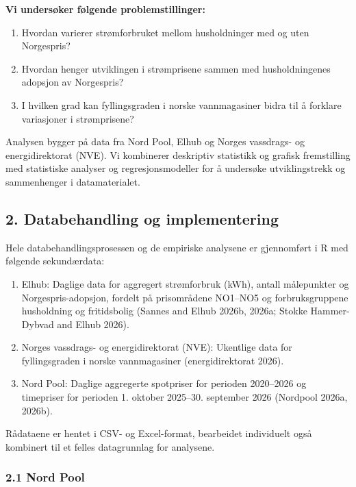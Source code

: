 \documentclass[
  letterpaper,
  DIV=11,
  numbers=noendperiod]{scrartcl}
\begin{document}
\textbf{Vi undersøker følgende problemstillinger:}

\begin{enumerate}
\def\labelenumi{\arabic{enumi}.}
\item
  Hvordan varierer strømforbruket mellom husholdninger med og uten
  Norgespris?
\item
  Hvordan henger utviklingen i strømprisene sammen med husholdningenes
  adopsjon av Norgespris?
\item
  I hvilken grad kan fyllingsgraden i norske vannmagasiner bidra til å
  forklare variasjoner i strømprisene?
\end{enumerate}

Analysen bygger på data fra Nord Pool, Elhub og Norges vassdrags- og
energidirektorat (NVE). Vi kombinerer deskriptiv statistikk og grafisk
fremstilling med statistiske analyser og regresjonsmodeller for å
undersøke utviklingstrekk og sammenhenger i datamaterialet.

\subsection{2. Databehandling og
implementering}\label{databehandling-og-implementering}

Hele databehandlingsprosessen og de empiriske analysene er gjennomført i
R med følgende sekundærdata:

\begin{enumerate}
\def\labelenumi{\arabic{enumi}.}
\item
  Elhub: Daglige data for aggregert strømforbruk (kWh), antall
  målepunkter og Norgespris-adopsjon, fordelt på prisområdene NO1--NO5
  og forbruksgruppene husholdning og fritidsbolig (Sannes and Elhub
  2026b, 2026a; Stokke Hammer-Dybvad and Elhub 2026).
\item
  Norges vassdrags- og energidirektorat (NVE): Ukentlige data for
  fyllingsgraden i norske vannmagasiner (energidirektorat 2026).
\item
  Nord Pool: Daglige aggregerte spotpriser for perioden 2020--2026 og
  timepriser for perioden 1. oktober 2025--30. september 2026 (Nordpool
  2026a, 2026b).
\end{enumerate}

Rådataene er hentet i CSV- og Excel-format, bearbeidet individuelt også
kombinert til et felles datagrunnlag for analysene.

\subsubsection{2.1 Nord Pool}\label{nord-pool}
\end{document}
